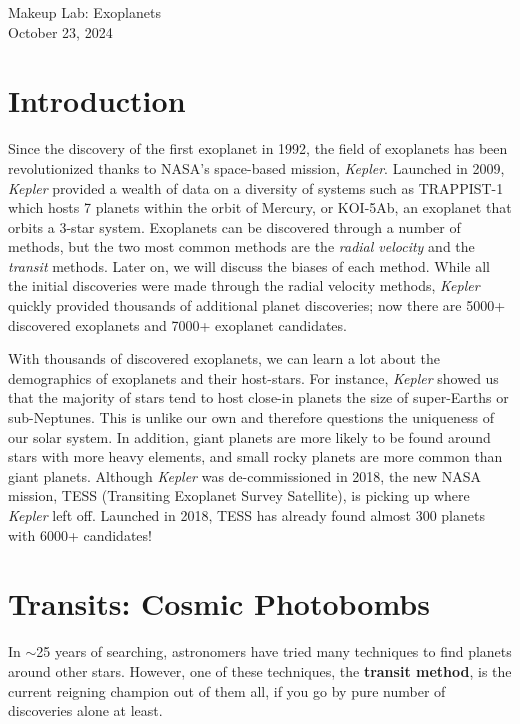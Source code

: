 \documentclass[11pt]{article}
\begin{document}
\begin{center}
\huge{Makeup Lab: Exoplanets}\\ \medskip \Large{October 23, 2024}
\end{center}

\section{Introduction}

Since the discovery of the first exoplanet in 1992, the field of exoplanets has been revolutionized thanks to NASA's space-based mission, \textit{Kepler}. Launched in 2009, \textit{Kepler} provided a wealth of data on a diversity of systems such as TRAPPIST-1 which hosts 7 planets within the orbit of Mercury, or KOI-5Ab, an exoplanet that orbits a 3-star system. Exoplanets can be discovered through a number of methods, but the two most common methods are the \textit{radial velocity} and the \textit{transit} methods. Later on, we will discuss the biases of each method. While all the initial discoveries were made through the radial velocity methods, \textit{Kepler} quickly provided thousands of additional planet discoveries; now there are 5000+ discovered exoplanets and 7000+ exoplanet candidates. 

\medskip \noindent
With thousands of discovered exoplanets, we can learn a lot about the demographics of exoplanets and their host-stars. For instance, \textit{Kepler} showed us that the majority of stars tend to host close-in planets the size of super-Earths or sub-Neptunes. This is unlike our own and therefore questions the uniqueness of our solar system. In addition, giant planets are more likely to be found around stars with more heavy elements, and small rocky planets are more common than giant planets.  Although \textit{Kepler} was de-commissioned in 2018, the new NASA mission, TESS (Transiting Exoplanet Survey Satellite), is picking up where \textit{Kepler} left off. Launched in 2018, TESS has already found almost 300 planets with 6000+ candidates!


\section{Transits: Cosmic Photobombs}

In $\sim$25 years of searching, astronomers have tried many techniques to find planets around other stars. However, one of these techniques, the \textbf{transit method}, is the current reigning champion out of them all, if you go by pure number of discoveries alone at least.
\end{document}
